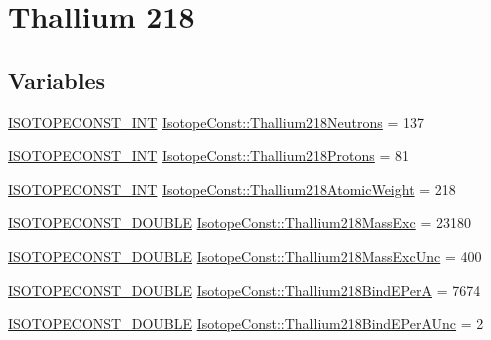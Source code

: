 \hypertarget{group___isotope_const-_thallium-_tl218}{}\section{Thallium 218}
\label{group___isotope_const-_thallium-_tl218}
\subsection*{Variables}
\begin{DoxyCompactItemize}
\item 
\mbox{\hyperlink{group___isotope_const-_macros_ga5f18360b3e99483a35c32d789e62621c}{I\+S\+O\+T\+O\+P\+E\+C\+O\+N\+S\+T\+\_\+\+I\+NT}} \mbox{\hyperlink{group___isotope_const-_thallium-_tl218_gad42932116ffbcd5069f2e24c1333a51c}{Isotope\+Const\+::\+Thallium218\+Neutrons}} = 137
\item 
\mbox{\hyperlink{group___isotope_const-_macros_ga5f18360b3e99483a35c32d789e62621c}{I\+S\+O\+T\+O\+P\+E\+C\+O\+N\+S\+T\+\_\+\+I\+NT}} \mbox{\hyperlink{group___isotope_const-_thallium-_tl218_ga3fe882f06cbeb8a701db740274f17a8c}{Isotope\+Const\+::\+Thallium218\+Protons}} = 81
\item 
\mbox{\hyperlink{group___isotope_const-_macros_ga5f18360b3e99483a35c32d789e62621c}{I\+S\+O\+T\+O\+P\+E\+C\+O\+N\+S\+T\+\_\+\+I\+NT}} \mbox{\hyperlink{group___isotope_const-_thallium-_tl218_gad85be732c26e662fcf2dbb1d553fb847}{Isotope\+Const\+::\+Thallium218\+Atomic\+Weight}} = 218
\item 
\mbox{\hyperlink{group___isotope_const-_macros_ga8f45a7272ce02c0b4c65c44636ed719a}{I\+S\+O\+T\+O\+P\+E\+C\+O\+N\+S\+T\+\_\+\+D\+O\+U\+B\+LE}} \mbox{\hyperlink{group___isotope_const-_thallium-_tl218_ga370a5bffe31e4c31f186e01633d80a0d}{Isotope\+Const\+::\+Thallium218\+Mass\+Exc}} = 23180
\item 
\mbox{\hyperlink{group___isotope_const-_macros_ga8f45a7272ce02c0b4c65c44636ed719a}{I\+S\+O\+T\+O\+P\+E\+C\+O\+N\+S\+T\+\_\+\+D\+O\+U\+B\+LE}} \mbox{\hyperlink{group___isotope_const-_thallium-_tl218_ga85aa24c43161b3b96ee8105793f1ddcb}{Isotope\+Const\+::\+Thallium218\+Mass\+Exc\+Unc}} = 400
\item 
\mbox{\hyperlink{group___isotope_const-_macros_ga8f45a7272ce02c0b4c65c44636ed719a}{I\+S\+O\+T\+O\+P\+E\+C\+O\+N\+S\+T\+\_\+\+D\+O\+U\+B\+LE}} \mbox{\hyperlink{group___isotope_const-_thallium-_tl218_gac3face8712bbf76633a0efd7a4b4a628}{Isotope\+Const\+::\+Thallium218\+Bind\+E\+PerA}} = 7674
\item 
\mbox{\hyperlink{group___isotope_const-_macros_ga8f45a7272ce02c0b4c65c44636ed719a}{I\+S\+O\+T\+O\+P\+E\+C\+O\+N\+S\+T\+\_\+\+D\+O\+U\+B\+LE}} \mbox{\hyperlink{group___isotope_const-_thallium-_tl218_ga5162e5f67b441a47f7a946d9bd8de4a5}{Isotope\+Const\+::\+Thallium218\+Bind\+E\+Per\+A\+Unc}} = 2

\end{DoxyCompactItemize}
